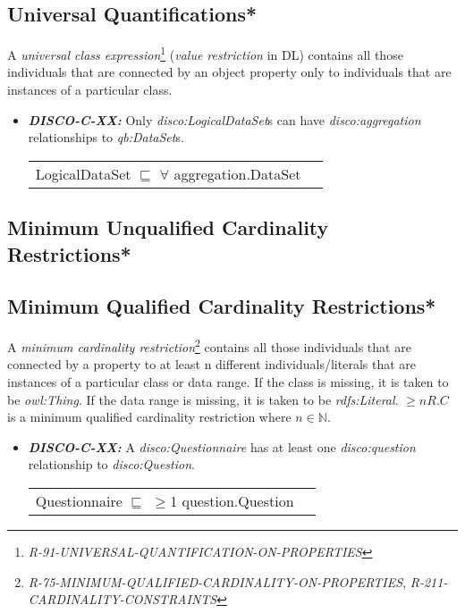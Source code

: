 \documentclass{llncs}
\newenvironment{DL}{
  \vspace{0cm}
  \begin{tabular}{r l}

}{
  \end{tabular}
}
\begin{document}
\subsection{Universal Quantifications*}

A \emph{universal class expression}\footnote{{\em R-91-UNIVERSAL-QUANTIFICATION-ON-PROPERTIES}} ({\em value restriction} in DL) contains all those individuals that are connected by an object property only to individuals that are instances of a particular class.

\begin{itemize}
	\item \textbf{{\em DISCO-C-XX:}}
Only {\em disco:LogicalDataSet}s can have {\em disco:aggregation} relationships to {\em qb:DataSet}s.

\begin{DL}
LogicalDataSet $\sqsubseteq$ $\forall$ aggregation.DataSet \\
\end{DL}
\end{itemize}

\subsection{Minimum Unqualified Cardinality Restrictions*}

\subsection{Minimum Qualified Cardinality Restrictions*}

A \emph{minimum cardinality restriction}\footnote{{\em R-75-MINIMUM-QUALIFIED-CARDINALITY-ON-PROPERTIES}, {\em R-211-CARDINALITY-CONSTRAINTS}} contains all those individuals that are connected by a property to at least n different individuals/literals 
that are instances of a particular class or data range. If the class is missing, it is taken to be \emph{owl:Thing}. 
If the data range is missing, it is taken to be \emph{rdfs:Literal}.
$\geq n R. C$ is a minimum qualified cardinality restriction where $n \in \mathbb{N}$.

\begin{itemize}
	\item \textbf{{\em DISCO-C-XX:}}
A {\em disco:Questionnaire} has at least one {\em disco:question} relationship to {\em disco:Question}.

\begin{DL}
Questionnaire $\sqsubseteq$ $\geq$1 question.Question
\end{DL}
\end{itemize}
\end{document}
